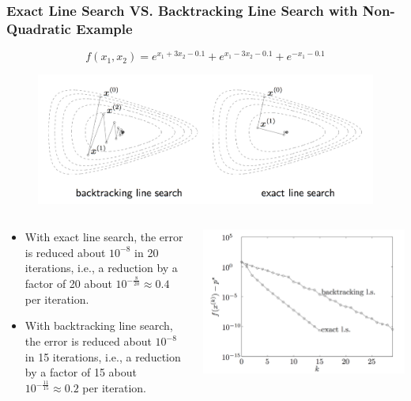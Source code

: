 \begin{frame}
  \frametitle{Exact Line Search VS.  Backtracking Line Search with
    Non-Quadratic Example}
$$f(x_1, x_2) = e^{x_1+3x_2-0.1} + e^{x_1-3x_2-0.1} + e^{-x_1-0.1}$$

\begin{figure}
\centering
\includegraphics[scale=0.25]{pics/btes.png}
\end{figure}



\begin{columns}
  \begin{column}{0.6\textwidth}
{\tiny
    \begin{itemize}
    \item With exact line search, the error is reduced about $10^{-8}$
      in 20 iterations, i.e., a reduction by a factor of
20 about $10^{-\frac{8}{20}} \approx 0.4$ per iteration.
\item With backtracking line search, the error is reduced
about $10^{-8}$ in 15 iterations, i.e., a reduction by a factor of
15 about $10^{-\frac{11}{15}} \approx 0.2$ per iteration.
    \end{itemize}
}
  \end{column}

\begin{column}{0.5\textwidth}
\includegraphics[scale = 0.12]{pics/els.png}

\end{column}

\end{columns}
\end{frame}


